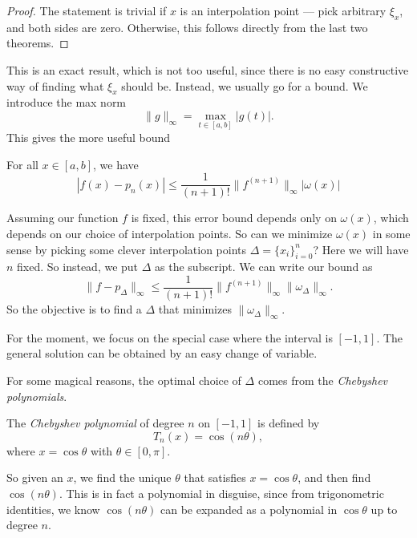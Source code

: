 \documentclass[a4paper]{article}
\begin{document}
\begin{proof}
  The statement is trivial if $x$ is an interpolation point --- pick arbitrary $\xi_x$, and both sides are zero. Otherwise, this follows directly from the last two theorems.
\end{proof}

This is an exact result, which is not too useful, since there is no easy constructive way of finding what $\xi_x$ should be. Instead, we usually go for a bound. We introduce the max norm
\[
  \|g\|_{\infty} = \max_{t \in [a, b]} |g(t)|.
\]
This gives the more useful bound
\begin{prop}
  For all $x \in [a, b]$, we have
  \[
    |f(x) - p_n(x)| \leq \frac{1}{(n + 1)!} \|f^{(n + 1)}\|_{\infty} |\omega(x)|
  \]
\end{prop}

Assuming our function $f$ is fixed, this error bound depends only on $\omega(x)$, which depends on our choice of interpolation points. So can we minimize $\omega(x)$ in some sense by picking some clever interpolation points $\Delta = \{x_i\}_{i = 0}^n$? Here we will have $n$ fixed. So instead, we put $\Delta$ as the subscript. We can write our bound as
\[
  \|f - p_{\Delta}\|_{\infty} \leq \frac{1}{(n + 1)!} \|f^{(n + 1)}\|_{\infty} \|\omega_{\Delta}\|_{\infty}.
\]
So the objective is to find a $\Delta$ that minimizes $\|\omega_{\Delta}\|_{\infty}$.

For the moment, we focus on the special case where the interval is $[-1, 1]$. The general solution can be obtained by an easy change of variable.

For some magical reasons, the optimal choice of $\Delta$ comes from the \emph{Chebyshev polynomials}.
\begin{defi}
  The \emph{Chebyshev polynomial} of degree $n$ on $[-1, 1]$ is defined by
  \[
    T_n(x) = \cos(n \theta),
  \]
  where $x = \cos \theta$ with $\theta\in [0, \pi]$.
\end{defi}
So given an $x$, we find the unique $\theta$ that satisfies $x = \cos \theta$, and then find $\cos (n \theta)$. This is in fact a polynomial in disguise, since from trigonometric identities, we know $\cos (n\theta)$ can be expanded as a polynomial in $\cos \theta$ up to degree $n$.
\end{document}
